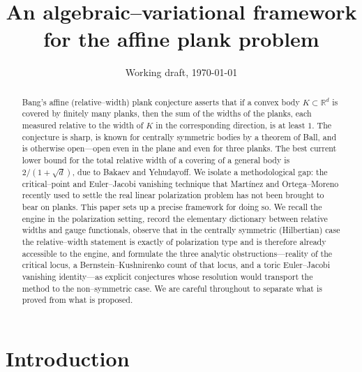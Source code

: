 \documentclass[11pt,reqno]{amsart}
\theoremstyle{plain}
\theoremstyle{definition}
\newcommand{\R}{\mathbb{R}}
\begin{document}
\title[An algebraic--variational framework for the affine plank problem]
{An algebraic--variational framework for the affine plank problem}

\author{}
\address{}
\email{}

\date{Working draft, \today}


\begin{abstract}
Bang's affine (relative--width) plank conjecture asserts that if a convex body
$K\subset\R^d$ is covered by finitely many planks, then the sum of the widths of
the planks, each measured relative to the width of $K$ in the corresponding
direction, is at least $1$. The conjecture is sharp, is known for centrally
symmetric bodies by a theorem of Ball, and is otherwise open---open even in the
plane and even for three planks. The best current lower bound for the total
relative width of a covering of a general body is $2/(1+\sqrt d)$, due to Bakaev
and Yehudayoff. We isolate a methodological gap: the critical--point and
Euler--Jacobi vanishing technique that Mart\'inez and Ortega--Moreno recently
used to settle the real linear polarization problem has not been brought to bear
on planks. This paper sets up a precise framework for doing so. We recall the
engine in the polarization setting, record the elementary dictionary between
relative widths and gauge functionals, observe that in the centrally symmetric
(Hilbertian) case the relative--width statement is exactly of polarization type
and is therefore already accessible to the engine, and formulate the three
analytic obstructions---reality of the critical locus, a Bernstein--Kushnirenko
count of that locus, and a toric Euler--Jacobi vanishing identity---as explicit
conjectures whose resolution would transport the method to the non--symmetric
case. We are careful throughout to separate what is proved from what is proposed.
\end{abstract}

\maketitle

\section{Introduction}\label{sec:intro}
\end{document}
